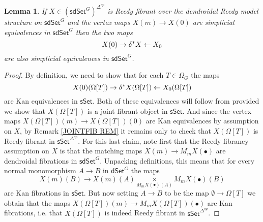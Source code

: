 \documentclass[a4paper,10pt]{article}%
\numberwithin{equation}{section}
\numberwithin{figure}{section}
\newtheorem{lemma}[equation]{Lemma}%
\theoremstyle{definition} %
\newcommand{\1}{\ensuremath{\mathbbm 1}}%
\begin{document}
\begin{lemma}\label{DIAGWE LEM}
If $X \in (\mathsf{sdSet}^G)^{\Delta^{op}}$ is
Reedy fibrant 
over the dendroidal Reedy model structure 
on $\mathsf{sdSet}^G$
and the vertex maps 
$X(m) \to X(0)$ are simplicial equivalences in $\mathsf{sdSet}^G$
then the two maps
\[
X(0) \to \delta^{\**} X \leftarrow X_0
\]
are also simplicial equivalences in $\mathsf{sdSet}^G$.
\end{lemma}

\begin{proof}
By definition,
we need to show that for each $T \in \Omega_G$ the maps 
\[
	X(0)(\Omega[T]) \to 
	\delta^{\**} X (\Omega[T]) \leftarrow
	X_0 (\Omega[T])
\]	
are Kan equivalences in $\mathsf{sSet}$.
Both of these equivalences will follow from 
\cite[Prop. 4.5(iv)]{BP_edss}
provided we show that
$X(\Omega[T])$ is a joint fibrant object in $\mathsf{sSet}$.
And since the vertex maps 
$X(\Omega[T])(m) \to X(\Omega[T])(0)$
are Kan equivalences by assumption on $X$,
by Remark \ref{JOINTFIB REM} it remains only to check that
$X(\Omega[T])$
is Reedy fibrant in $\mathsf{sSet}^{\Delta^{op}}$.
For this last claim, 
note first that the Reedy fibrancy 
assumption on $X$ is that the matching maps 
$X(m) \to M_m X(\bullet)$
are dendroidal fibrations in 
$\mathsf{sdSet}^G$.
Unpacking definitions,
this means that for every normal monomorphism 
$A \to B$ in $\mathsf{dSet}^G$ the maps
\[
X(m)(B) \to 
X(m)(A) \underset{{M_m X(\bullet)(A)}}{\times} M_m X(\bullet)(B)
\]
are Kan fibrations in $\mathsf{sSet}$.
But now setting $A \to B$ to be the map $\emptyset \to \Omega[T]$
we obtain that the maps
$X(\Omega[T])(m) \to 
M_m X(\Omega[T])(\bullet)$
are Kan fibrations, i.e. that 
$X(\Omega[T])$ is indeed Reedy fibrant
in $\mathsf{sSet}^{\Delta^{op}}$.
\end{proof}
\end{document}
